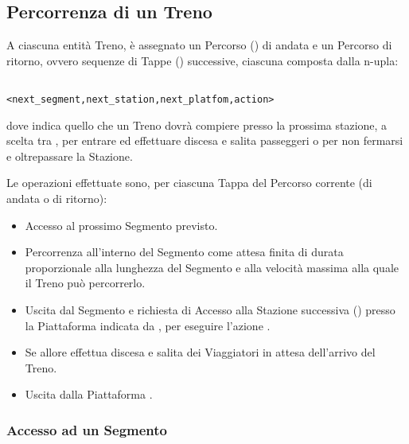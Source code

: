 	\subsection{Percorrenza di un Treno}
	
	A ciascuna entità Treno, è assegnato un Percorso () di andata e un Percorso di ritorno, ovvero sequenze di Tappe () successive, ciascuna composta dalla n-upla:
				\begin{center}
					\begin{verbatim}
						       <next_segment,next_station,next_platfom,action>
					\end{verbatim}
				\end{center}
dove  indica quello che un Treno dovrà compiere presso la prossima stazione, a scelta tra , per entrare ed effettuare discesa e salita passeggeri o  per non fermarsi e oltrepassare la Stazione.

Le operazioni effettuate sono, per ciascuna Tappa del Percorso corrente (di andata o di ritorno):
				\begin{itemize} 
					\item Accesso al prossimo Segmento  previsto.
					\item Percorrenza all'interno del Segmento come attesa finita di durata proporzionale alla lunghezza del Segmento e alla velocità massima alla quale il Treno può percorrerlo.
					\item Uscita dal Segmento e richiesta di Accesso alla Stazione successiva () presso la Piattaforma indicata da , per eseguire l'azione .
					\item Se  allore effettua discesa e salita dei Viaggiatori in attesa dell'arrivo del Treno.
					\item Uscita dalla Piattaforma .
				\end{itemize}

	
		\subsubsection{Accesso ad un Segmento}
		
